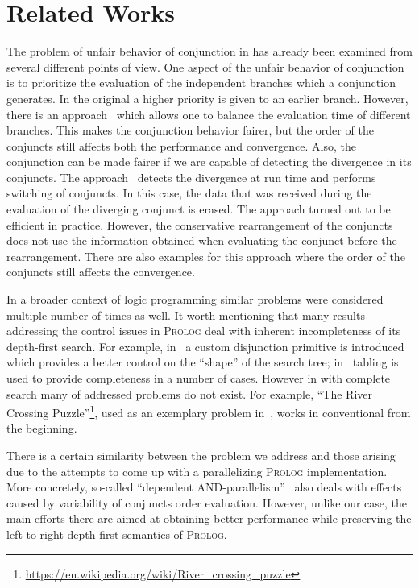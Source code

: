 \section{Related Works}
\label{sec:related}

The problem of unfair behavior of conjunction in \mk has already been examined from several different points of view. One aspect of the unfair behavior of conjunction is to prioritize the
evaluation of the independent branches which a conjunction generates. In the original \mk a higher priority is given to an earlier branch. However, there is an approach~\cite{fair:towardsAM}
which allows one to balance the evaluation time of different branches. This makes the conjunction behavior fairer, but the order of the conjuncts still affects both the performance and convergence.
Also, the conjunction can be made fairer if we are capable of detecting the divergence in its conjuncts. The approach~\cite{fair:DivTest} detects the divergence at run time and
performs switching of conjuncts. In this case, the data that was received during the evaluation of the diverging conjunct is erased. The approach turned out to be efficient in practice.
However, the conservative rearrangement of the conjuncts does not use the information obtained when evaluating the conjunct before the rearrangement. There are also examples for
this approach where the order of the conjuncts still affects the convergence.

In a broader context of logic programming similar problems were considered multiple number of times as well. It worth mentioning that many results addressing the control
issues in \textsc{Prolog} deal with inherent incompleteness of its depth-first search. For example, in~\cite{Schrijvers2012TorES} a custom disjunction primitive is
introduced which provides a better control on the ``shape'' of the search tree; in~\cite{OLDresolution} tabling is used to provide completeness in a number of cases.
However in \mk with complete search many of addressed problems do not exist. For example, ``The River Crossing Puzzle''\footnote{\url{https://en.wikipedia.org/wiki/River_crossing_puzzle}},
used as an exemplary problem in~\cite{Schrijvers2012TorES}, works in conventional \mk from the beginning.

There is a certain similarity between the problem we address and those arising due to the attempts to come up with a parallelizing \textsc{Prolog} implementation. More concretely, so-called
``dependent AND-parallelism''~\cite{Parallel} also deals with effects caused by variability of conjuncts order evaluation. However, unlike our case, the main efforts there are
aimed at obtaining better performance while preserving the left-to-right depth-first semantics of \textsc{Prolog}. 

